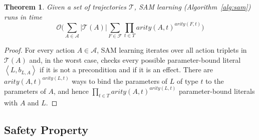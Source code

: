 \documentclass{article}
\newtheorem{theorem}{Theorem}
\newcommand{\tuple}[1]{\ensuremath{\left \langle #1 \right \rangle }}
\newcommand{\liftf}{F}
\newcommand{\liftl}{L}
\newcommand{\lifta}{A}
\begin{document}


\begin{theorem}
Given a set of trajectories $\mathcal{T}$, SAM learning (Algorithm~\ref{alg:sam}) runs in time 
\[\mathcal{O}\Big(\sum_{\lifta\in \mathcal{A}}|\mathcal{T}(\lifta)|\sum_{\liftf\in\mathcal{F}}\prod_{t\in T}arity(\lifta,t)^{arity(\liftf,t)}\Big)\]
\end{theorem}
\begin{proof}
For every action $\lifta\in\mathcal{A}$, SAM learning iterates over all action triplets in $\mathcal{T}(\lifta)$ 
and, in the worst case, checks every possible parameter-bound literal $\tuple{\liftl, b_{\liftl,\lifta}}$ if it is not a precondition and if it is an effect. 
There are $arity(\lifta, t)^{arity(\liftl, t)}$ ways to bind the parameters of $\liftl$ of type $t$ to the parameters of $\lifta$, and hence $\prod_{t\in T}arity(\lifta, t)^{arity(
\liftl, t)}$ parameter-bound literals with $\lifta$ and $\liftl$. 
\end{proof}


\subsection{Safety Property}
\end{document}
